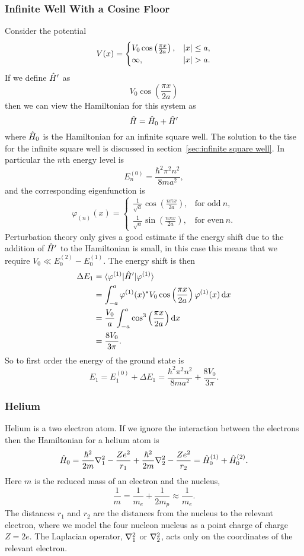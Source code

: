 \documentclass[a4paper]{article}
\renewcommand{\ket}[1]{\vert {#1} \rangle}
\renewcommand{\bra}[1]{\langle {#1} \vert}
\theoremstyle{definition}
\begin{document}
    \subsubsection{Infinite Well With a Cosine Floor}
    Consider the potential
    \[
        V(x) = 
        \begin{cases}
            V_0\cos\left(\frac{\pi x}{2a}\right), & \abs{x} \le a,\\
            \infty, & \abs{x} > a.
        \end{cases}
    \]
    If we define \(\hat{H}'\) as
    \[V_0 \cos\left(\frac{\pi x}{2a}\right)\]
    then we can view the Hamiltonian for this system as
    \[\hat{H} = \hat{H}_0 + \hat{H}'\]
    where \(\hat{H}_0\) is the Hamiltonian for an infinite square well.
    The solution to the \gls{tise} for the infinite square well is discussed in section~\ref{sec:infinite square well}.
    In particular the \(n\)th energy level is
    \[E_n^{(0)} = \frac{\hbar^2\pi^2 n^2}{8ma^2},\]
    and the corresponding eigenfunction is
    \[
        \varphi_{(n)}(x) =
        \begin{cases}
            \frac{1}{\sqrt{a}}\cos\left(\frac{n\pi x}{2a}\right), & \text{for odd}~n,\\
            \frac{1}{\sqrt{a}}\sin\left(\frac{n\pi x}{2a}\right), & \text{for even}~n.
        \end{cases}
    \]
    Perturbation theory only gives a good estimate if the energy shift due to the addition of \(\hat{H}'\) to the Hamiltonian is small, in this case this means that we require \(V_0 \ll E_0^{(2)} - E_0^{(1)}\).
    The energy shift is then
    \begin{align*}
        \Delta E_1 &= \bra{\varphi^{(1)}}\operator{H}'\ket{\varphi^{(1)}}\\
        &= \int_{-a}^{a} \varphi^{(1)}(x)^*V_0\cos\left(\frac{\pi x}{2a}\right)\varphi^{(1)} (x)\dd{x}\\
        &= \frac{V_0}{a} \int_{-a}^{a} \cos^3\left(\frac{\pi x}{2a}\right) \dd{x}\\
        &= \frac{8V_0}{3\pi}.
    \end{align*}
    So to first order the energy of the ground state is
    \[E_1 = E_1^{(0)} + \Delta E_1 = \frac{\hbar^2\pi^2 n^2}{8ma^2} + \frac{8V_0}{3\pi}.\]
    
    \subsubsection{Helium}
    Helium is a two electron atom.
    If we ignore the interaction between the electrons then the Hamiltonian for a helium atom is
    \[\hat{H}_0 = \frac{\hbar^2}{2m}\nabla^2_1 - \frac{Ze^2}{r_1} + \frac{\hbar^2}{2m}\nabla^2_2 - \frac{Ze^2}{r_2} = \hat{H}_0^{(1)} + \hat{H}_0^{(2)}.\]
    Here \(m\) is the reduced mass of an electron and the nucleus,
    \[\frac{1}{m} = \frac{1}{m_e} + \frac{1}{2m_p} \approx \frac{1}{m_e}.\]
    The distances \(r_1\) and \(r_2\) are the distances from the nucleus to the relevant electron, where we model the four nucleon nucleus as a point charge of charge \(Z = 2e\).
    The Laplacian operator, \(\nabla^2_1\) or \(\nabla^2_2\), acts only on the coordinates of the relevant electron.
    
\end{document}
